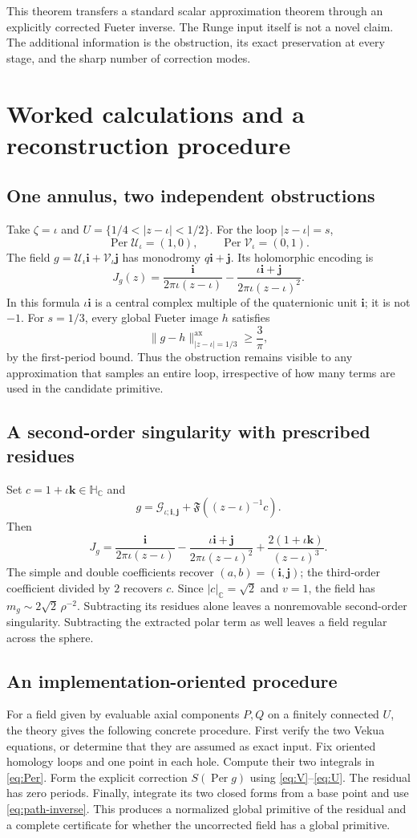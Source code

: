 \documentclass[11pt,a4paper]{article}
\numberwithin{equation}{section}
\theoremstyle{definition}
\theoremstyle{remark}
\newcommand{\C}{\mathbb C}
\newcommand{\HC}{\mathbb H_{\C}}
\newcommand{\ii}{\mathbf i}
\newcommand{\jj}{\mathbf j}
\newcommand{\kk}{\mathbf k}
\newcommand{\Fu}{\mathfrak F}
\newcommand{\Per}{\operatorname{Per}}
\newcommand{\G}{\mathcal G}
\newcommand{\Uker}{\mathcal U}
\newcommand{\Vker}{\mathcal V}
\newcommand{\pairnorm}[1]{\lVert #1\rVert^{\mathrm{ax}}}
\newcommand{\cnorm}[1]{\lvert #1\rvert_{\C}}
\begin{document}
This theorem transfers a standard scalar approximation theorem through
an explicitly corrected Fueter inverse. The Runge input itself is not a
novel claim. The additional information is the obstruction, its exact
preservation at every stage, and the sharp number of correction modes.

\section{Worked calculations and a reconstruction procedure}
\label{sec:examples}

\subsection{One annulus, two independent obstructions}
Take $\zeta=\iota$ and
$U=\{1/4<|z-\iota|<1/2\}$. For the loop $|z-\iota|=s$,
\[
 \Per\Uker_{\iota}=(1,0),\qquad
 \Per\Vker_{\iota}=(0,1).
\]
The field $g=\Uker_{\iota}\ii+\Vker_{\iota}\jj$ has monodromy
$q\ii+\jj$. Its holomorphic encoding is
\[
 J_g(z)=\frac{\ii}{2\pi\iota(z-\iota)}
       -\frac{\iota\ii+\jj}{2\pi\iota(z-\iota)^2}.
\]
In this formula $\iota\ii$ is a central complex multiple of the
quaternionic unit $\ii$; it is not $-1$.
For $s=1/3$, every global Fueter image $h$ satisfies
\[
 \pairnorm{g-h}_{|z-\iota|=1/3}\ge\frac3\pi,
\]
by the first-period bound. Thus the obstruction remains visible to any
approximation that samples an entire loop, irrespective of how many
terms are used in the candidate primitive.

\subsection{A second-order singularity with prescribed residues}
Set $c=1+\iota\kk\in\HC$ and
\[
 g=\G_{\iota;\ii,\jj}+\Fu((z-\iota)^{-1}c).
\]
Then
\[
 J_g=\frac{\ii}{2\pi\iota(z-\iota)}
     -\frac{\iota\ii+\jj}{2\pi\iota(z-\iota)^2}
     +\frac{2(1+\iota\kk)}{(z-\iota)^3}.
\]
The simple and double coefficients recover $(a,b)=(\ii,\jj)$; the
third-order coefficient divided by $2$ recovers $c$. Since
$\cnorm c=\sqrt2$ and $v=1$, the field has
$m_g\sim2\sqrt2\,\rho^{-2}$. Subtracting its residues alone leaves a
nonremovable second-order singularity. Subtracting the extracted polar
term as well leaves a field regular across the sphere.

\subsection{An implementation-oriented procedure}
For a field given by evaluable axial components $P,Q$ on a finitely
connected $U$, the theory gives the following concrete procedure.
First verify the two Vekua equations, or determine that they are assumed
as exact input. Fix oriented homology loops and one point in each hole.
Compute their two integrals in \eqref{eq:Per}. Form the explicit
correction $S(\Per g)$ using \eqref{eq:V}--\eqref{eq:U}. The residual has
zero periods. Finally, integrate its two closed forms from a base point
and use \eqref{eq:path-inverse}. This produces a normalized global
primitive of the residual and a complete certificate for whether the
uncorrected field has a global primitive.
\end{document}
